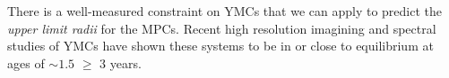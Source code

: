 There is a well-measured constraint on YMCs that we can apply to predict the\textit{ upper limit radii} for the MPCs. Recent high resolution imagining and spectral studies of YMCs have shown these systems to be in or close to equilibrium at ages of $∼1.5$ $\geq$ $3$ years. \cite{Darwin_1900}\\